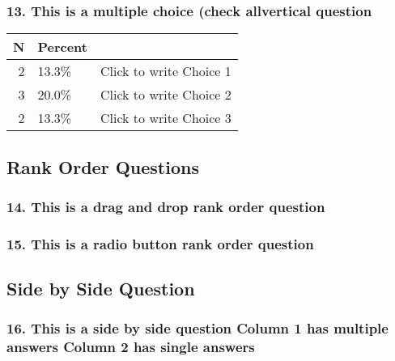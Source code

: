 \documentclass{article}\usepackage[]{graphicx}\usepackage[]{color}
\begin{document}
\hfill \break \hfill \break
\subsubsection*{13.
This is a multiple choice (check allvertical question}

\begin{tabular}{r|l|l}
\hline
N & Percent & \\
\hline
2 & 13.3\% & Click to write Choice 1\\
\hline
3 & 20.0\% & Click to write Choice 2\\
\hline
2 & 13.3\% & Click to write Choice 3\\
\hline
\end{tabular}


\hfill \break \hfill \break
\subsection*{Rank Order Questions}
\subsubsection*{14.
This is a drag and drop rank order question}

\hfill \break \hfill \break
\subsubsection*{15.
This is a radio button rank order question}

\hfill \break \hfill \break
\subsection*{Side by Side Question}
\subsubsection*{16.
This is a side by side question Column 1 has multiple answers Column 2 has single answers}

\hfill \break \hfill \break
\end{document}
